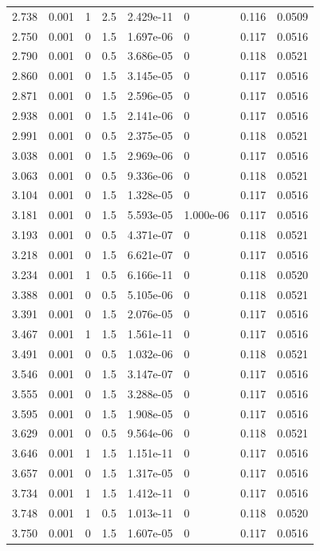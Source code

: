 \documentclass[preview]{standalone}
\begin{document}
{{{\begin{tabular}{L{1.2cm}C{1.2cm} C{0.3cm}C{0.5cm} C{1.4cm}C{1.4cm} C{1.4cm}C{1.4cm}}
  2.738  &  0.001  & 1     & 2.5 &  2.429e-11  & 0  & 0.116 &  0.0509   \\ 
  2.750  &  0.001  & 0     & 1.5 &  1.697e-06  & 0  & 0.117 &  0.0516   \\ 
  2.790  &  0.001  & 0     & 0.5 &  3.686e-05  & 0  & 0.118 &  0.0521   \\ 
  2.860  &  0.001  & 0     & 1.5 &  3.145e-05  & 0  & 0.117 &  0.0516   \\ 
  2.871  &  0.001  & 0     & 1.5 &  2.596e-05  & 0  & 0.117 &  0.0516   \\ 
  2.938  &  0.001  & 0     & 1.5 &  2.141e-06  & 0  & 0.117 &  0.0516   \\ 
  2.991  &  0.001  & 0     & 0.5 &  2.375e-05  & 0  & 0.118 &  0.0521   \\ 
  3.038  &  0.001  & 0     & 1.5 &  2.969e-06  & 0  & 0.117 &  0.0516   \\ 
  3.063  &  0.001  & 0     & 0.5 &  9.336e-06  & 0  & 0.118 &  0.0521   \\ 
  3.104  &  0.001  & 0     & 1.5 &  1.328e-05  & 0  & 0.117 &  0.0516   \\ 
  3.181  &  0.001  & 0     & 1.5 &  5.593e-05  & 1.000e-06  & 0.117 &  0.0516   \\ 
  3.193  &  0.001  & 0     & 0.5 &  4.371e-07  & 0  & 0.118 &  0.0521   \\ 
  3.218  &  0.001  & 0     & 1.5 &  6.621e-07  & 0  & 0.117 &  0.0516   \\ 
  3.234  &  0.001  & 1     & 0.5 &  6.166e-11  & 0  & 0.118 &  0.0520   \\ 
  3.388  &  0.001  & 0     & 0.5 &  5.105e-06  & 0  & 0.118 &  0.0521   \\ 
  3.391  &  0.001  & 0     & 1.5 &  2.076e-05  & 0  & 0.117 &  0.0516   \\ 
  3.467  &  0.001  & 1     & 1.5 &  1.561e-11  & 0  & 0.117 &  0.0516   \\ 
  3.491  &  0.001  & 0     & 0.5 &  1.032e-06  & 0  & 0.118 &  0.0521   \\ 
  3.546  &  0.001  & 0     & 1.5 &  3.147e-07  & 0  & 0.117 &  0.0516   \\ 
  3.555  &  0.001  & 0     & 1.5 &  3.288e-05  & 0  & 0.117 &  0.0516   \\ 
  3.595  &  0.001  & 0     & 1.5 &  1.908e-05  & 0  & 0.117 &  0.0516   \\ 
  3.629  &  0.001  & 0     & 0.5 &  9.564e-06  & 0  & 0.118 &  0.0521   \\ 
  3.646  &  0.001  & 1     & 1.5 &  1.151e-11  & 0  & 0.117 &  0.0516   \\ 
  3.657  &  0.001  & 0     & 1.5 &  1.317e-05  & 0  & 0.117 &  0.0516   \\ 
  3.734  &  0.001  & 1     & 1.5 &  1.412e-11  & 0  & 0.117 &  0.0516   \\ 
  3.748  &  0.001  & 1     & 0.5 &  1.013e-11  & 0  & 0.118 &  0.0520   \\ 
  3.750  &  0.001  & 0     & 1.5 &  1.607e-05  & 0  & 0.117 &  0.0516   \\ 
\hline 
\end{tabular} 

}}}
\end{document}
